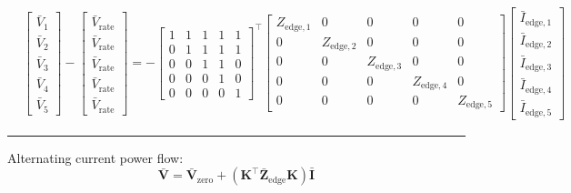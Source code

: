 \documentclass[
]{book}
\begin{document}
\[ \begin{aligned}
  &
  \left[\begin{array}{c}
    \bar{V}_{1} \\
    \bar{V}_{2} \\
    \bar{V}_{3} \\
    \bar{V}_{4} \\
    \bar{V}_{5}
  \end{array}\right]
  -
  \left[\begin{array}{c}
    \bar{V}_\text{rate} \\
    \bar{V}_\text{rate} \\
    \bar{V}_\text{rate} \\
    \bar{V}_\text{rate} \\
    \bar{V}_\text{rate}
  \end{array}\right]
  =
  - \left[\begin{array}{ccccc}
    1 & 1 & 1 & 1 & 1 \\ 
    0 & 1 & 1 & 1 & 1 \\ 
    0 & 0 & 1 & 1 & 0 \\ 
    0 & 0 & 0 & 1 & 0 \\ 
    0 & 0 & 0 & 0 & 1
  \end{array} \right]^{\top}
  \left[\begin{array}{ccccc}
    Z_{\text{edge}, 1} & 0 & 0 & 0 & 0 \\
    0 & Z_{\text{edge}, 2} & 0 & 0 & 0 \\
    0 & 0 & Z_{\text{edge}, 3} & 0 & 0 \\
    0 & 0 & 0 & Z_{\text{edge}, 4} & 0 \\
    0 & 0 & 0 & 0 & Z_{\text{edge}, 5}
  \end{array}\right]
  \left[\begin{array}{l}
    \bar{I}_{\text{edge}, 1} \\
    \bar{I}_{\text{edge}, 2} \\
    \bar{I}_{\text{edge}, 3} \\
    \bar{I}_{\text{edge}, 4} \\
    \bar{I}_{\text{edge}, 5}
  \end{array} \right]
\end{aligned} \]

\begin{center}\rule{0.5\linewidth}{0.5pt}\end{center}

Alternating current power flow:
\[
  \bar{\boldsymbol{V}} = \bar{\boldsymbol{V}}_{\text{zero}}
    + \left( \boldsymbol{K}^{\top} \boldsymbol{\bar{Z}}_\text{edge}
    \boldsymbol{K} \right) \bar{\boldsymbol{I}}
\]
\end{document}
